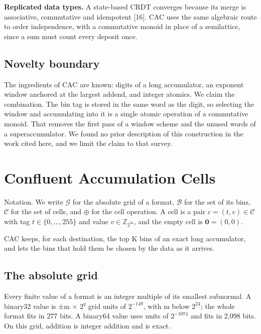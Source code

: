 \documentclass[3p,10pt]{elsarticle}
\begin{document}
\textbf{Replicated data types.} A state-based CRDT converges because its
merge is associative, commutative and idempotent {[}16{]}. CAC uses the
same algebraic route to order independence, with a commutative monoid in
place of a semilattice, since a sum must count every deposit once.

\hypertarget{novelty-boundary}{%
\subsection{Novelty boundary}\label{novelty-boundary}}

The ingredients of CAC are known: digits of a long accumulator, an
exponent window anchored at the largest addend, and integer atomics. We
claim the combination. The bin tag is stored in the same word as the
digit, so selecting the window and accumulating into it is a single
atomic operation of a commutative monoid. That removes the first pass of
a window scheme and the unused words of a superaccumulator. We found no
prior description of this construction in the work cited here, and we
limit the claim to that survey.

\hypertarget{confluent-accumulation-cells}{%
\section{Confluent Accumulation
Cells}\label{confluent-accumulation-cells}}

Notation. We write \(\mathcal{G}\) for the absolute grid of a format,
\(\mathcal{B}\) for the set of its bins, \(\mathcal{C}\) for the set of
cells, and \(\oplus\) for the cell operation. A cell is a pair
\(c=(t,v)\in\mathcal{C}\) with tag \(t\in\{0,\dots,255\}\) and value
\(v\in\mathbb{Z}_{2^{56}}\), and the empty cell is \(\mathbf{0}=(0,0)\).

CAC keeps, for each destination, the top K bins of an exact long
accumulator, and lets the bins that hold them be chosen by the data as
it arrives.

\hypertarget{the-absolute-grid}{%
\subsection{The absolute grid}\label{the-absolute-grid}}

Every finite value of a format is an integer multiple of its smallest
subnormal. A binary32 value is ±m × \(2^q\) grid units of \(2^{-149}\),
with m below \(2^{24}\); the whole format fits in 277 bits. A binary64
value uses units of \(2^{-1074}\) and fits in 2,098 bits. On this grid,
addition is integer addition and is exact.
\end{document}
